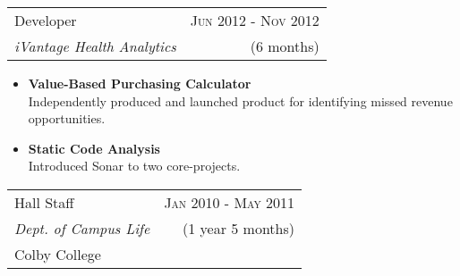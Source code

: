 \documentclass[10pt]{article} %
\begin{document}
{\begin{minipage}[t]{0.5\textwidth}
\begin{itemize}
\end{itemize}


\begin{tabularx}{\linewidth}{ X r }
  {\large Developer } & {\textsc{Jun 2012 - Nov 2012}} \\
  {\small\textit{iVantage Health Analytics}} & {\small{(6 months)}}
\end{tabularx}

\begin{itemize}
  \item \small\textbf{Value-Based Purchasing Calculator} \\
    \small{Independently produced and launched product for identifying missed revenue opportunities.}
  \item \small\textbf{Static Code Analysis} \\
    \small{Introduced Sonar to two core-projects.}
\end{itemize}


\begin{tabularx}{\linewidth}{ X r }
  {\large Hall Staff } & {\textsc{Jan 2010 - May 2011}} \\
  {\small{\textit{Dept. of Campus Life}}} & {\small{(1 year 5 months)}} \\
  {\small{Colby College}} 
\end{tabularx}

\vspace{10pt}



\end{minipage}}
\end{document}
